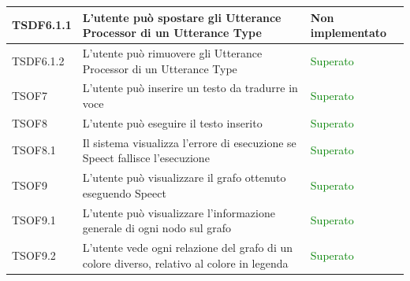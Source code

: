 \documentclass[openany,12pt,a4paper]{report}
\begin{document}
\begin{longtable}[c]{| p{2cm} |p{8cm} | p{2.5cm} |}
	\newline TSDF6.1.1&
	\newline L'utente può spostare gli Utterance Processor di un Utterance Type&
	\newline Non implementato
	\\[1em]
	\hline	
	
	\newline TSDF6.1.2&
	\newline L'utente può rimuovere gli Utterance Processor di un Utterance Type&
	\newline \textcolor{green}{Superato}
	\\[1em]
	\hline	
	
	\newline TSOF7&
	\newline L'utente può inserire un testo da tradurre in voce&
	\newline \textcolor{green}{Superato}
	\\[1em]
	
	\hline
	\newline TSOF8&
	\newline L'utente può eseguire il testo inserito&
	\newline \textcolor{green}{Superato}
	\\[1em]
	\hline
	\newline TSOF8.1&
	\newline Il sistema visualizza l'errore di esecuzione se Speect fallisce l'esecuzione&
	\newline \textcolor{green}{Superato}
	\\[1em]
	\hline
	
	\newline TSOF9&
	\newline L'utente può visualizzare il grafo ottenuto eseguendo Speect&
	\newline \textcolor{green}{Superato}
	\\[1em]
	\hline
	
	
	\newline TSOF9.1&
	\newline L'utente può visualizzare l'informazione generale di ogni nodo sul grafo&
	\newline \textcolor{green}{Superato}
	\\[1em]
	\hline
	
	\newline TSOF9.2&
	\newline L'utente vede ogni relazione del grafo di un colore diverso, relativo al colore in legenda&
	\newline  \textcolor{green}{Superato}
	\\[1em]
	\hline
	

\end{longtable}
\end{document}
